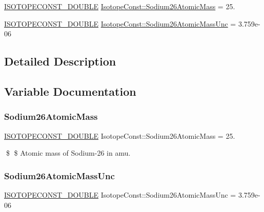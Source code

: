 \begin{DoxyCompactItemize}
\item 
\mbox{\hyperlink{group___isotope_const-_macros_ga8f45a7272ce02c0b4c65c44636ed719a}{I\+S\+O\+T\+O\+P\+E\+C\+O\+N\+S\+T\+\_\+\+D\+O\+U\+B\+LE}} \mbox{\hyperlink{group___isotope_const-_sodium-_na26_ga91683a2953927d91d94874650c5b7ed5}{Isotope\+Const\+::\+Sodium26\+Atomic\+Mass}} = 25.
\item 
\mbox{\hyperlink{group___isotope_const-_macros_ga8f45a7272ce02c0b4c65c44636ed719a}{I\+S\+O\+T\+O\+P\+E\+C\+O\+N\+S\+T\+\_\+\+D\+O\+U\+B\+LE}} \mbox{\hyperlink{group___isotope_const-_sodium-_na26_ga51c9005a83bb335e764a6b98312cde5f}{Isotope\+Const\+::\+Sodium26\+Atomic\+Mass\+Unc}} = 3.\+759e-\/06
\end{DoxyCompactItemize}


\subsection{Detailed Description}


\subsection{Variable Documentation}
\mbox{\label{group___isotope_const-_sodium-_na26_ga91683a2953927d91d94874650c5b7ed5}} 
\subsubsection{\texorpdfstring{Sodium26\+Atomic\+Mass}{Sodium26AtomicMass}}
{\footnotesize\ttfamily \mbox{\hyperlink{group___isotope_const-_macros_ga8f45a7272ce02c0b4c65c44636ed719a}{I\+S\+O\+T\+O\+P\+E\+C\+O\+N\+S\+T\+\_\+\+D\+O\+U\+B\+LE}} Isotope\+Const\+::\+Sodium26\+Atomic\+Mass = 25.}

\$ \$ Atomic mass of Sodium-\/26 in amu. \mbox{\label{group___isotope_const-_sodium-_na26_ga51c9005a83bb335e764a6b98312cde5f}} 
\subsubsection{\texorpdfstring{Sodium26\+Atomic\+Mass\+Unc}{Sodium26AtomicMassUnc}}
{\footnotesize\ttfamily \mbox{\hyperlink{group___isotope_const-_macros_ga8f45a7272ce02c0b4c65c44636ed719a}{I\+S\+O\+T\+O\+P\+E\+C\+O\+N\+S\+T\+\_\+\+D\+O\+U\+B\+LE}} Isotope\+Const\+::\+Sodium26\+Atomic\+Mass\+Unc = 3.\+759e-\/06}

